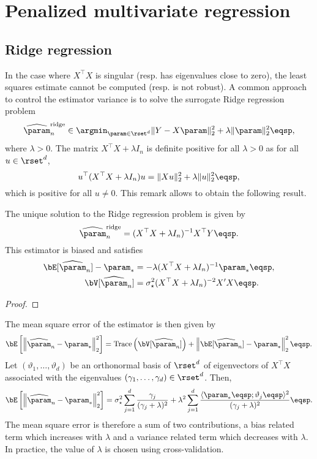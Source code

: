 \chapter{Penalized multivariate regression}
\minitoc


\section{Ridge regression}
In the case where $X^\top X$ is singular (resp. has eigenvalues close to zero), the least squares estimate cannot be computed (resp. is not robust). A common approach to control the estimator variance is to solve the surrogate Ridge regression problem
\[
\widehat \param^{\mathrm{ridge}}_n\in  \argmin_{\param\in\rset^d}  \|Y - X\param\|_2^2 + \lambda\|\param\|_2^2\eqsp,
\]
where $\lambda>0$. The matrix $X^\top X + \lambda I_n$ is definite positive for all $\lambda>0$ as for all $u\in\rset^d$,
\[
u^\top (X^\top X + \lambda I_n)u = \|Xu\|_2^2 + \lambda \|u\|_2^2\eqsp,
\]
which is positive for all $u\neq 0$. This remark allows to obtain the following result.

\begin{shaded}
\begin{proposition}
\label{prop:least:squares:ridge}
The unique solution to the Ridge regression problem is given by
\[
\widehat \param^{\mathrm{ridge}}_n = (X^\top X + \lambda I_n)^{-1}X^\top Y\eqsp.
\] 
This estimator is biased and satisfies 
\begin{align*}
\bE[\widehat \param_n] - \param_*&= - \lambda(X^\top X + \lambda I_n)^{-1}\param_*\eqsp,\\
\bV[\widehat \param_n] &= \sigma_\star^2(X^\top X + \lambda I_n)^{-2}X'X \eqsp.
\end{align*}
\end{proposition}
\end{shaded}
\begin{proof}

\end{proof}
The mean square error of the estimator is then given by
\[
\bE\left[\left\|\widehat \param_n-\param_*\right\|_2^2\right] = \mathrm{Trace}\left(\bV[\widehat \param_n]\right) + \left\|\bE[\widehat \param_n] - \param_*\right\|_2^2\eqsp.
\]
Let $(\vartheta_1,\ldots,\vartheta_d)$ be an orthonormal basis of $\rset^d$ of eigenvectors of $X^\top X$ associated with the eigenvalues $(\gamma_1,\ldots,\gamma_d)\in\rset^d$. Then,
\[
\bE\left[\left\|\widehat \param_n-\param_*\right\|_2^2\right] =  \sigma_\star^2 \sum_{j=1}^d \frac{\gamma_j}{(\gamma_j+\lambda)^2} + \lambda^2  \sum_{j=1}^d \frac{\langle \param_* \eqsp; \vartheta_j\eqsp\rangle^2}{(\gamma_j+\lambda)^2}\eqsp.
\]
The mean square error is therefore a sum of two contributions, a bias related term which increases with $\lambda$ and a variance related term which decreases with $\lambda$. In practice, the value of $\lambda$ is chosen using cross-validation.

